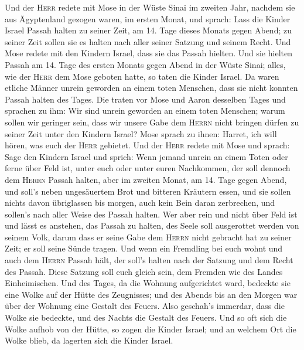 Und der \textsc{Herr} redete mit Mose in der Wüste Sinai
im zweiten Jahr, nachdem sie aus Ägyptenland gezogen waren, im ersten
Monat, und sprach:  Lass die Kinder Israel Passah halten
zu seiner Zeit,  am 14. Tage dieses Monats gegen Abend; zu
seiner Zeit sollen sie es halten nach aller seiner Satzung und seinem
Recht.  Und Mose redete mit den Kindern Israel, dass sie
das Passah hielten.  Und sie hielten Passah am 14. Tage
des ersten Monats gegen Abend in der Wüste Sinai; alles, wie der
\textsc{Herr} dem Mose geboten hatte, so taten die Kinder Israel.
 Da waren etliche Männer unrein geworden an einem toten
Menschen, dass sie nicht konnten Passah halten des Tages. Die traten vor
Mose und Aaron desselben Tages  und sprachen zu ihm: Wir
sind unrein geworden an einem toten Menschen; warum sollen wir geringer
sein, dass wir unsere Gabe dem \textsc{Herrn} nicht bringen dürfen zu
seiner Zeit unter den Kindern Israel?  Mose sprach zu
ihnen: Harret, ich will hören, was euch der \textsc{Herr} gebietet.
 Und der \textsc{Herr} redete mit Mose und sprach:
 Sage den Kindern Israel und sprich: Wenn jemand unrein
an einem Toten oder ferne über Feld ist, unter euch oder unter euren
Nachkommen, der soll dennoch dem \textsc{Herrn} Passah halten,
 aber im zweiten Monat, am 14. Tage gegen Abend, und
soll's neben ungesäuertem Brot und bitteren Kräutern essen,
 und sie sollen nichts davon übriglassen bis morgen, auch
kein Bein daran zerbrechen, und sollen's nach aller Weise des Passah
halten.  Wer aber rein und nicht über Feld ist und lässt
es anstehen, das Passah zu halten, des Seele soll ausgerottet werden von
seinem Volk, darum dass er seine Gabe dem \textsc{Herrn} nicht gebracht
hat zu seiner Zeit; er soll seine Sünde tragen.  Und wenn
ein Fremdling bei euch wohnt und auch dem \textsc{Herrn} Passah hält,
der soll's halten nach der Satzung und dem Recht des Passah. Diese
Satzung soll euch gleich sein, dem Fremden wie des Landes Einheimischen.
 Und des Tages, da die Wohnung aufgerichtet ward,
bedeckte sie eine Wolke auf der Hütte des Zeugnisses; und des Abends bis
an den Morgen war über der Wohnung eine Gestalt des Feuers.
 Also geschah's immerdar, dass die Wolke sie bedeckte,
und des Nachts die Gestalt des Feuers.  Und so oft sich
die Wolke aufhob von der Hütte, so zogen die Kinder Israel; und an
welchem Ort die Wolke blieb, da lagerten sich die Kinder Israel.
